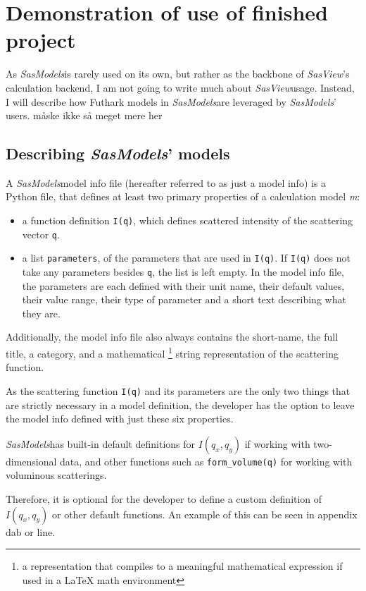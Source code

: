 \documentclass[11pt]{article}
\newcommand{\sasmodels}{\textit{SasModels}}
\newcommand{\sasview}{\textit{SasView}}
\begin{document}
\section{Demonstration of use of finished project}
As \sasmodels is rarely used on its own, but rather as the backbone of 
\sasview's calculation backend, I am not going to write much about 
\sasview usage.
Instead, I will describe how Futhark models in \sasmodels are leveraged 
by \sasmodels' users.
måske ikke så meget mere her


\subsection{Describing \sasmodels' models}
A \sasmodels model info file (hereafter referred to as just a model info) is a 
Python file, that defines at least two primary properties of a 
calculation model \textit{m}:
\begin{itemize}

  \item a function definition \texttt{I(q)}, which defines scattered intensity 
  of the scattering vector \texttt{q}.

  \item a list \texttt{parameters}, of the parameters that are used in 
  \texttt{I(q)}. If \texttt{I(q)} does not take any parameters besides 
  \texttt{q}, the list is left empty.
  In the model info file, the parameters are each defined with their unit name, 
  their default values, their value range, their type of parameter and
  a short text describing what they are.
\end{itemize}

Additionally, the model info file also always contains the short-name, 
the full title, a category, and a mathematical \footnote{a representation 
that compiles to a meaningful mathematical expression if used in a LaTeX math 
environment} string representation of the scattering function.

As the scattering function \texttt{I(q)} and its parameters are the only 
two things that are strictly necessary in a model definition, the developer
has the option to leave the model info defined with just these six properties.

\sasmodels has built-in default definitions for $I(q_x,q_y)$ if working
with two-dimensional data, and other functions such as \texttt{form\_volume(q)}
for working with voluminous scatterings.

Therefore, it is optional for the developer to define a custom definition
of $I(q_x, q_y)$ or other default functions.
An example of this can be seen in appendix dab or line.
\end{document}
